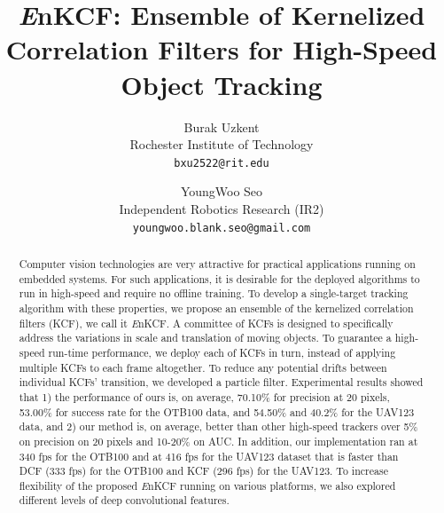\documentclass[10pt,twocolumn,letterpaper]{article}
\begin{document}
\title{{\it E}nKCF: Ensemble of Kernelized Correlation Filters for
  High-Speed Object Tracking}

\author{Burak Uzkent \\
Rochester Institute of Technology\\
{\tt\small bxu2522@rit.edu}
\and
YoungWoo Seo \\
Independent Robotics Research (IR2)\\
{\tt\small youngwoo.blank.seo@gmail.com}
}

\maketitle
\ifwacvfinal\thispagestyle{empty}\fi

\begin{abstract}
Computer vision technologies are very attractive for practical
applications running on embedded systems. For such applications, it is
desirable for the deployed algorithms to run in high-speed and require
no offline training. To develop a single-target tracking algorithm
with these properties, we propose an ensemble of the kernelized
correlation filters (KCF), we call it {\it E}nKCF. A committee of KCFs
is designed to specifically address the variations in scale and
translation of moving objects. To guarantee a high-speed run-time
performance, we deploy each of KCFs in turn, instead of applying
multiple KCFs to each frame altogether. To reduce any potential drifts
between individual KCFs' transition, we developed a particle
filter. Experimental results showed that 1) the performance of ours
is, on average, 70.10\% for precision at 20 pixels, 53.00\% for
success rate for the OTB100 data, and 54.50\% and 40.2\% for the
UAV123 data, and 2) our method is, on average, better than other
high-speed trackers over 5\% on precision on 20 pixels and 10-20\% on
AUC. In addition, our implementation ran at 340 fps for the OTB100 and
at 416 fps for the UAV123 dataset that is faster than DCF (333 fps)
for the OTB100 and KCF (296 fps) for the UAV123. To increase
flexibility of the proposed {\it E}nKCF running on various platforms,
we also explored different levels of deep convolutional features.
\end{abstract}
\end{document}
